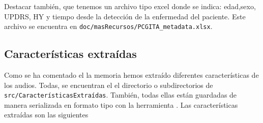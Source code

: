 Destacar también, que tenemos un archivo tipo excel donde se indica: edad,sexo, UPDRS, HY y tiempo desde la detección de la enfermedad del paciente. Este archivo se encuentra en \texttt{doc/masRecursos/PCGITA\_metadata.xlsx}.

\subsection{Características extraídas}
Como se ha comentado el la memoria hemos extraído diferentes características de los audios. Todas, se encuentran el el directorio o subdirectorios de \texttt{src/CaracterísticasExtraídas}. También, todas ellas están guardadas de manera serializada en formato tipo  con la herramienta . Las características extraídas son las siguientes

